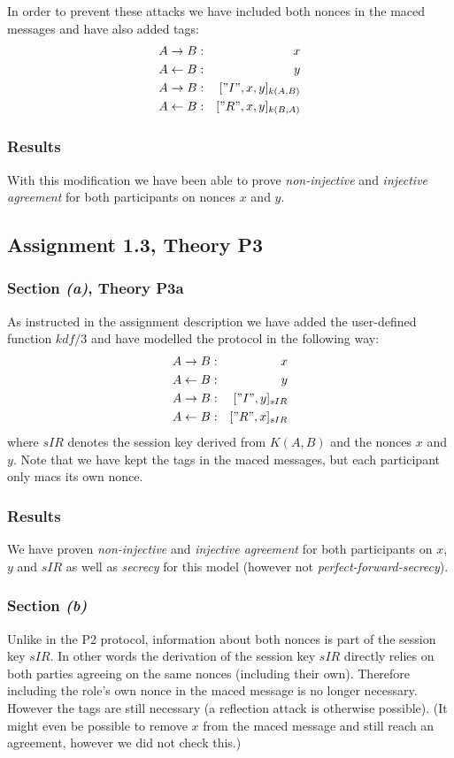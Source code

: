 \documentclass[a4paper]{article}
\begin{document}
In order to prevent these attacks we have included both nonces in the maced messages and have also added tags:
\begin{eqnarray*}
A \to B        & : & x\\
A \leftarrow B & : & y\\
A \to B        & : & ["I", x, y]_{k(A,B)}\\
A \leftarrow B & : & ["R", x, y]_{k(B,A)} 
\end{eqnarray*}

\subsubsection*{Results}
With this modification we have been able to prove {\em non-injective} and {\em injective agreement} for both participants on nonces $x$ and $y$.


\subsection{Assignment 1.3, Theory P3}
\subsubsection{Section {\it\bf (a)}, Theory P3a}
As instructed in the assignment description we have added the user-defined function $kdf/3$ and have modelled the protocol in the following way:
\begin{eqnarray*}
A \to B        & : & x\\
A \leftarrow B & : & y\\
A \to B        & : & ["I",y]_{sIR}\\
A \leftarrow B & : & ["R",x]_{sIR} 
\end{eqnarray*}
\noindent where $sIR$ denotes the session key derived from $K(A,B)$ and the nonces $x$ and $y$. Note that we have kept the tags in the maced messages, but each participant only macs its own nonce.

\subsubsection*{Results}
We have proven {\em non-injective} and {\em injective agreement} for both participants on $x$, $y$ and $sIR$ as well as {\em secrecy} for this model (however not {\em perfect-forward-secrecy}).

\subsubsection{Section {\it\bf (b)}}
Unlike in the P2 protocol, information about both nonces is part of the session key $sIR$. In other words the derivation of the session key $sIR$ directly relies on both parties agreeing on the same nonces (including their own). Therefore including the role's own nonce in the maced message is no longer necessary. However the tags are still necessary (a reflection attack is otherwise possible).
(It might even be possible to remove $x$ from the maced message and still reach an agreement, however we did not check this.)
\end{document}
